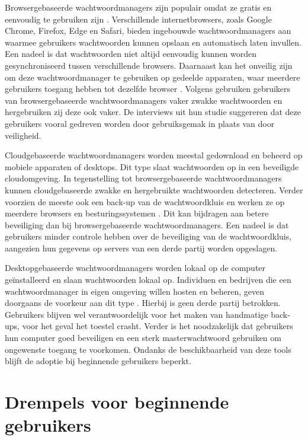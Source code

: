 Browsergebaseerde wachtwoordmanagers zijn populair omdat ze gratis en eenvoudig te gebruiken zijn \autocite{Rimasiute2025}. Verschillende internetbrowsers, zoals Google Chrome, Firefox, Edge en Safari, bieden ingebouwde wachtwoordmanagers aan waarmee gebruikers wachtwoorden kunnen opslaan en automatisch laten invullen. Een nadeel is dat wachtwoorden niet altijd eenvoudig kunnen worden gesynchroniseerd tussen verschillende browsers. Daarnaast kan het onveilig zijn om deze wachtwoordmanager te gebruiken op gedeelde apparaten, waar meerdere gebruikers toegang hebben tot dezelfde browser \autocite{Zoho}.
Volgens \textcite{Pearman2019} gebruiken gebruikers van browsergebaseerde wachtwoordmanagers vaker zwakke wachtwoorden en hergebruiken zij deze ook vaker. De interviews uit hun studie suggereren dat deze gebruikers vooral gedreven worden door gebruiksgemak in plaats van door veiligheid.

Cloudgebaseerde wachtwoordmanagers worden meestal gedownload en beheerd op mobiele apparaten of desktops. Dit type slaat wachtwoorden op in een beveiligde cloudomgeving. In tegenstelling tot browsergebaseerde wachtwoordmanagers kunnen cloudgebaseerde zwakke en hergebruikte wachtwoorden detecteren. Verder voorzien de meeste ook een back-up van de wachtwoordkluis en werken ze op meerdere browsers en besturingssystemen \autocite{Rimasiute2025}. Dit kan bijdragen aan betere beveiliging dan bij browsergebaseerde wachtwoordmanagers. Een nadeel is dat gebruikers minder controle hebben over de beveiliging van de wachtwoordkluis, aangezien hun gegevens op servers van een derde partij worden opgeslagen.

Desktopgebaseerde wachtwoordmanagers worden lokaal op de computer geïnstalleerd en slaan wachtwoorden lokaal op. Individuen en bedrijven die een wachtwoordmanager in eigen omgeving willen hosten en beheren, geven doorgaans de voorkeur aan dit type \autocite{Zoho}. Hierbij is geen derde partij betrokken. Gebruikers blijven wel verantwoordelijk voor het maken van handmatige back-ups, voor het geval het toestel crasht. Verder is het noodzakelijk dat gebruikers hun computer goed beveiligen en een sterk masterwachtwoord gebruiken om ongewenste toegang te voorkomen.
Ondanks de beschikbaarheid van deze tools blijft de adoptie bij beginnende gebruikers beperkt.

\section{Drempels voor beginnende gebruikers}

